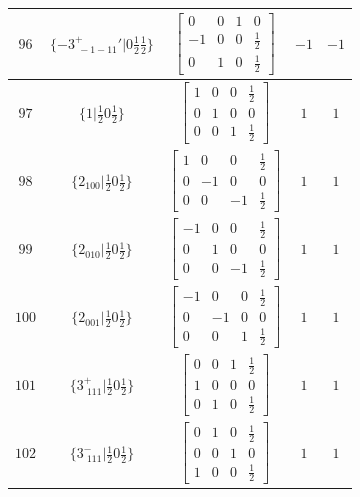 \documentclass[fleqn,8pt]{jsarticle}
\begin{document}
\begin{longtable}{ccccc}
$ 96 $ & $ \{-3^{+}_{\,\,-1-11}{}'|0 \frac{1}{2} \frac{1}{2}\} $ & $ \begin{bmatrix} 0 & 0 & 1 & 0 \\ -1 & 0 & 0 & \frac{1}{2} \\ 0 & 1 & 0 & \frac{1}{2} \end{bmatrix} $ & $ -1 $ & $ -1 $ \\ \hline
$ 97 $ & $ \{1|\frac{1}{2} 0 \frac{1}{2}\} $ & $ \begin{bmatrix} 1 & 0 & 0 & \frac{1}{2} \\ 0 & 1 & 0 & 0 \\ 0 & 0 & 1 & \frac{1}{2} \end{bmatrix} $ & $ 1 $ & $ 1 $ \\ \hline
$ 98 $ & $ \{2{}_{100}|\frac{1}{2} 0 \frac{1}{2}\} $ & $ \begin{bmatrix} 1 & 0 & 0 & \frac{1}{2} \\ 0 & -1 & 0 & 0 \\ 0 & 0 & -1 & \frac{1}{2} \end{bmatrix} $ & $ 1 $ & $ 1 $ \\ \hline
$ 99 $ & $ \{2{}_{010}|\frac{1}{2} 0 \frac{1}{2}\} $ & $ \begin{bmatrix} -1 & 0 & 0 & \frac{1}{2} \\ 0 & 1 & 0 & 0 \\ 0 & 0 & -1 & \frac{1}{2} \end{bmatrix} $ & $ 1 $ & $ 1 $ \\ \hline
$ 100 $ & $ \{2{}_{001}|\frac{1}{2} 0 \frac{1}{2}\} $ & $ \begin{bmatrix} -1 & 0 & 0 & \frac{1}{2} \\ 0 & -1 & 0 & 0 \\ 0 & 0 & 1 & \frac{1}{2} \end{bmatrix} $ & $ 1 $ & $ 1 $ \\ \hline
$ 101 $ & $ \{3^{+}_{\,\,111}|\frac{1}{2} 0 \frac{1}{2}\} $ & $ \begin{bmatrix} 0 & 0 & 1 & \frac{1}{2} \\ 1 & 0 & 0 & 0 \\ 0 & 1 & 0 & \frac{1}{2} \end{bmatrix} $ & $ 1 $ & $ 1 $ \\ \hline
$ 102 $ & $ \{3^{-}_{\,\,111}|\frac{1}{2} 0 \frac{1}{2}\} $ & $ \begin{bmatrix} 0 & 1 & 0 & \frac{1}{2} \\ 0 & 0 & 1 & 0 \\ 1 & 0 & 0 & \frac{1}{2} \end{bmatrix} $ & $ 1 $ & $ 1 $ \\ \hline

\end{longtable}
\end{document}
